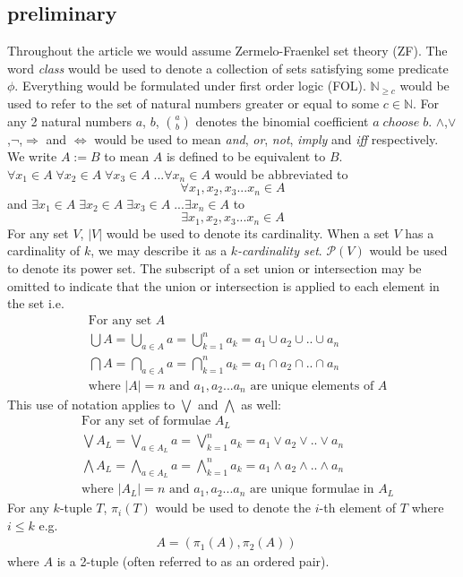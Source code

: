 \documentclass[11pt, oneside]{article}      %
\theoremstyle{definition}
\numberwithin{equation}{section}
\theoremstyle{c}
\begin{document}
\subsection{preliminary}
Throughout the article we would assume Zermelo-Fraenkel set theory (ZF). The word \textit{class} would be used to denote a collection of sets satisfying some predicate $\phi$. Everything would be formulated under first order logic (FOL). $\mathbb{N}_{\geq c}$ would be used to refer to the set of natural numbers greater or equal to some $c \in \mathbb{N}$. For any 2 natural numbers $a$, $b$, $\binom{a}{b}$ denotes the binomial coefficient $a \; choose \; b$. $\land$,$\lor$,$\neg$,$\Rightarrow$ and $\Leftrightarrow$ would be used to mean \textit{and}, \textit{or}, \textit{not}, \textit{imply} and \textit{iff} respectively. We write $A := B$ to mean $A$ is defined to be equivalent to $B$. $\forall x_1\in A \; \forall x_2 \in A \; \forall x_3 \in A \; ... \forall x_n \in A$ would be abbreviated to
\[
\forall x_1,x_2,x_3 ... x_n \in A
\]
and  $\exists x_1 \in A \; \exists x_2 \in A \; \exists x_3 \in A \; ... \exists x_n \in A $ to
\[
\exists x_1,x_2,x_3 ... x_n \in A
\]
For any set $V$, $|V|$ would be used to denote its cardinality. When a set $V$ has a cardinality of $k$, we may describe it as a \textit{$k$-cardinality set}. $\mathcal{P}(V)$ would be used to denote its power set.
The subscript of a set union or intersection may be omitted to indicate that the union or intersection is applied to each element in the set i.e.
\begin{align*}
&\text{For any set } A \\
& \bigcup A = \bigcup_{a \in A} a =  \bigcup_{k=1}^n a_k  = a_1 \cup a_2 \cup .. \cup a_n \\
& \bigcap A = \bigcap_{a \in A} a =  \bigcap_{k=1}^n a_k = a_1 \cap a_2 \cap .. \cap a_n \\
&\text{where } |A| = n \text{ and } a_1, a_2 ... a_n \text{ are unique elements of } A
\end{align*}
This use of notation applies to $\bigvee$ and $\bigwedge$ as well:
\begin{align*}
&\text{For any set of formulae } A_L \\
& \bigvee A_L = \bigvee_{a \in A_L} a =  \bigvee_{k=1}^n a_k = a_1 \vee a_2 \vee .. \vee a_n \\
& \bigwedge A_L = \bigwedge_{a \in A_L} a = \bigwedge_{k=1}^n a_k = a_1 \wedge a_2 \wedge .. \wedge a_n \\
&\text{where } |A_L| = n \text{ and } a_1, a_2 ... a_n \text{ are unique formulae in } A_L
\end{align*}
For any $k$-tuple $T$,  $\pi_i(T)$ would be used to denote the $i$-th element of $T$ where $i \leq k$ e.g.
\begin{align*}
A = (\pi_1(A),\pi_2(A)) \quad 
\end{align*}
where $A$ is a 2-tuple (often referred to as an ordered pair).
\end{document}
